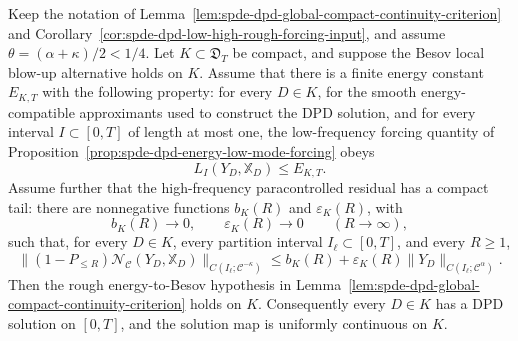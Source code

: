 \begin{proposition}
\label{prop:spde-dpd-high-frequency-tail-global-continuity}
Keep the notation of
Lemma~\ref{lem:spde-dpd-global-compact-continuity-criterion} and
Corollary~\ref{cor:spde-dpd-low-high-rough-forcing-input}, and assume
\(\theta=(\alpha+\kappa)/2<1/4\).  Let
\(K\subset\mathfrak D_T\) be compact, and suppose the Besov local
blow-up alternative holds on \(K\).  Assume that there is a finite energy
constant \(E_{K,T}\) with the following property: for every \(D\in K\), for
the smooth energy-compatible approximants used to construct the DPD solution,
and for every interval \(I\subset[0,T]\) of length at most one, the
low-frequency forcing quantity of
Proposition~\ref{prop:spde-dpd-energy-low-mode-forcing} obeys
\begin{equation}
  L_I(Y_D,\mathbb X_D)\leq E_{K,T}.
  \label{eq:spde-dpd-compact-energy-window-bound}
\end{equation}
Assume further that the high-frequency paracontrolled residual has a compact
tail: there are nonnegative functions \(b_K(R)\) and
\(\varepsilon_K(R)\), with
\[
  b_K(R)\longrightarrow0,
  \qquad
  \varepsilon_K(R)\longrightarrow0
  \qquad (R\to\infty),
\]
such that, for every \(D\in K\), every partition interval
\(I_\ell\subset[0,T]\), and every \(R\geq1\),
\begin{equation}
  \|(1-P_{\leq R})
      \mathcal N_{\mathcal C}(Y_D,\mathbb X_D)\|_
    {C(I_\ell;\mathcal C^{-\kappa})}
  \leq
  b_K(R)+\varepsilon_K(R)
  \|Y_D\|_{C(I_\ell;\mathcal C^\alpha)} .
  \label{eq:spde-dpd-compact-high-frequency-tail}
\end{equation}
Then the rough energy-to-Besov hypothesis in
Lemma~\ref{lem:spde-dpd-global-compact-continuity-criterion} holds on
\(K\).  Consequently every \(D\in K\) has a DPD solution on \([0,T]\), and
the solution map is uniformly continuous on \(K\).
\end{proposition}

